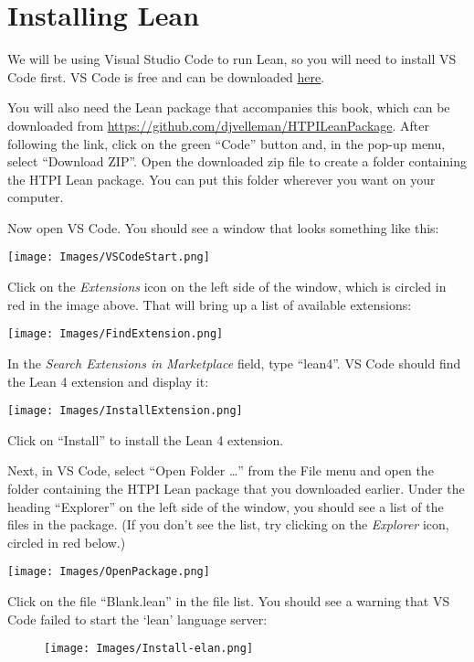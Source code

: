\documentclass[
  letterpaper,
  DIV=11,
  numbers=noendperiod]{scrreprt}
\theoremstyle{remark}
\begin{document}
\hypertarget{installing-lean}{%
\section*{Installing Lean}\label{installing-lean}}


We will be using Visual Studio Code to run Lean, so you will need to
install VS Code first. VS Code is free and can be downloaded
\href{https://code.visualstudio.com}{here}.

You will also need the Lean package that accompanies this book, which
can be downloaded from
\url{https://github.com/djvelleman/HTPILeanPackage}. After following the
link, click on the green ``Code'' button and, in the pop-up menu, select
``Download ZIP''. Open the downloaded zip file to create a folder
containing the HTPI Lean package. You can put this folder wherever you
want on your computer.

Now open VS Code. You should see a window that looks something like
this:

\texttt{[image: Images/VSCodeStart.png]}

Click on the \emph{Extensions} icon on the left side of the window,
which is circled in red in the image above. That will bring up a list of
available extensions:

\texttt{[image: Images/FindExtension.png]}

In the \emph{Search Extensions in Marketplace} field, type ``lean4''. VS
Code should find the Lean 4 extension and display it:

\texttt{[image: Images/InstallExtension.png]}

Click on ``Install'' to install the Lean 4 extension.

Next, in VS Code, select ``Open Folder \ldots{}'' from the File menu and
open the folder containing the HTPI Lean package that you downloaded
earlier. Under the heading ``Explorer'' on the left side of the window,
you should see a list of the files in the package. (If you don't see the
list, try clicking on the \emph{Explorer} icon, circled in red below.)

\texttt{[image: Images/OpenPackage.png]}

Click on the file ``Blank.lean'' in the file list. You should see a
warning that VS Code failed to start the `lean' language server:

\begin{figure}

{\centering \texttt{[image: Images/Install-elan.png]}

}

\end{figure}
\end{document}
